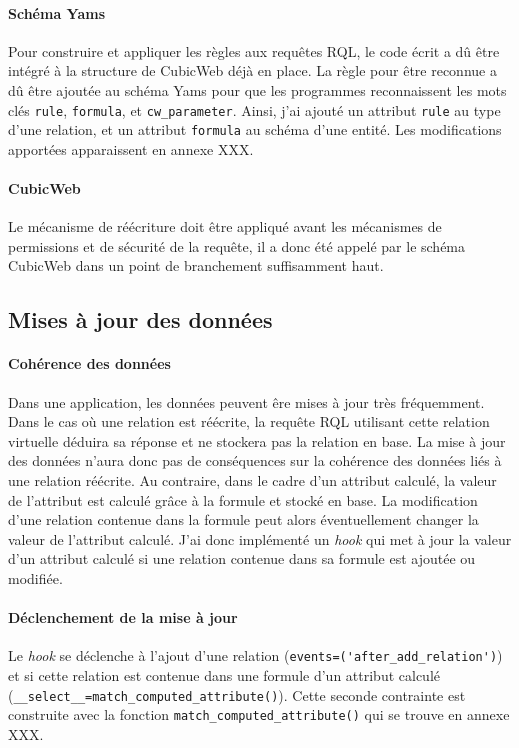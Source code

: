 \documentclass {report}
\begin{document}
\paragraph{Schéma Yams}
Pour construire et appliquer les règles aux requêtes RQL, le code écrit a dû être intégré à la structure de CubicWeb déjà en place. La règle pour être reconnue a dû être ajoutée au schéma Yams pour que les programmes reconnaissent les mots clés \verb+rule+, \verb+formula+, et \verb+cw_parameter+. Ainsi, j'ai ajouté un attribut \verb+rule+ au type d'une relation, et un attribut \verb+formula+ au schéma d'une entité. Les modifications apportées apparaissent en annexe XXX.

\paragraph{CubicWeb}
Le mécanisme de réécriture doit être appliqué avant les mécanismes de permissions et de sécurité de la requête, il a donc été appelé par le schéma CubicWeb dans un point de branchement suffisamment haut.

\subsection{Mises à jour des données}
\paragraph{Cohérence des données}
Dans une application, les données peuvent êre mises à jour très fréquemment. Dans le cas où une relation est réécrite, la requête RQL utilisant cette relation virtuelle déduira sa réponse et ne stockera pas la relation en base. La mise à jour des données n'aura donc pas de conséquences sur la cohérence des données liés à une relation réécrite. Au contraire, dans le cadre d'un attribut calculé, la valeur de l'attribut est calculé grâce à la formule et stocké en base. La modification d'une relation contenue dans la formule peut alors éventuellement changer la valeur de l'attribut calculé. J'ai donc implémenté un \textit{hook} qui met à jour la valeur d'un attribut calculé si une relation contenue dans sa formule est ajoutée ou modifiée.


\paragraph{Déclenchement de la mise à jour}
Le \textit{hook} se déclenche à l'ajout d'une relation (\verb+events=('after_add_relation')+) et si cette relation est contenue dans une formule d'un attribut calculé (\verb+__select__=match_computed_attribute()+). Cette seconde contrainte est construite avec la fonction \verb+match_computed_attribute()+ qui se trouve en annexe XXX.
\end{document}

